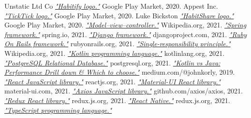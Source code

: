 \documentclass[twoside]{ctuthesis}
\begin{document}
\begin{thebibliography}{99}
            Unstatic Ltd Co
            \href{https://play.google.com/store/apps/details?id=co.unstatic.habitify}{\emph{"Habitify logo."}}
            Google Play Market, 2020.
            Appest Inc.
            \href{https://play.google.com/store/apps/details?id=com.ticktick.task}{\emph{"TickTick logo."}}
            Google Play Market, 2020.
        Luke Bickston
        \href{https://play.google.com/store/apps/details?id=com.habitshareapp}{\emph{"HabitShare logo."}}
        Google Play Market, 2020.
        \href{https://en.wikipedia.org/wiki/Model\%E2\%80\%93view\%E2\%80\%93controller}{\emph{"Model–view–controller."}}
        Wikipedia.org, 2021.
        \href{https://spring.io/}{\emph{"Spring framework."}}
        spring.io, 2021.
        \href{https://www.djangoproject.com/}{\emph{"Django framework."}}
        djangoproject.com, 2021.
        \href{https://spring.io/}{\emph{"Ruby On Rails framework."}}
        rubyonrails.org, 2021.
        \href{https://en.wikipedia.org/wiki/Single-responsibility_principle}{\emph{"Single-responsibility principle."}}
        Wikipedia.org, 2021.
        \href{https://kotlinlang.org/}{\emph{"Kotlin programming language."}}
        kotlinlang.org, 2021.
        \href{https://www.postgresql.org/}{\emph{"PostgreSQL Relational Database."}}
        postgresql.org, 2021.
        \href{https://medium.com/@johnkorly/kotlin-vs-java-performance-drill-down-which-to-choose-2514bdf91916}{\emph{"Kotlin vs Java: Performance Drill down \& Which to choose."}}
        medium.com/@johnkorly, 2019.
        \href{https://reactjs.org/}{\emph{"React JavaScript library."}}
        reactjs.org, 2021.
        \href{https://material-ui.com/}{\emph{"Material-UI React library."}}
        material-ui.com, 2021.
        \href{https://github.com/axios/axios}{\emph{"Axios JavaScript library."}}
        github.com/axios/axios, 2021.
        \href{https://redux.js.org/}{\emph{"Redux React library."}}
        redux.js.org, 2021.
        \href{https://reactnative.dev/}{\emph{"React Native."}}
        redux.js.org, 2021.
        \href{https://www.typescriptlang.org/}{\emph{"TypeScript programming language."}}

\end{thebibliography}
\end{document}
